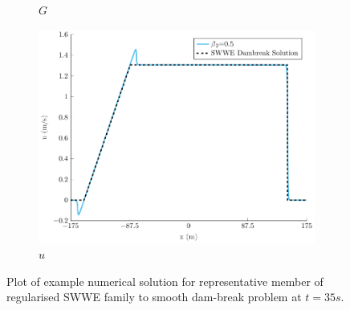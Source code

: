 \documentclass[10pt]{elsarticle}
\begin{document}
\begin{figure}
\begin{subfigure}{0.32\textwidth}
		\caption{$G$}
		\label{Fig:rSWWE_EX_G}
	\end{subfigure}
	\begin{subfigure}{0.32\textwidth}
		\centering
		\includegraphics[width=\textwidth]{./Figures/Simulations/Study/RegSWWE/Convergence/u.pdf}
		\caption{$u$}
		\label{Fig:rSWWE_EX_u}
	\end{subfigure}
	\caption{Plot of example numerical solution for representative member of regularised SWWE family to smooth dam-break problem at $t=35s$.}
	\label{Fig:rSWWE_EX}
\end{figure}
\end{document}
